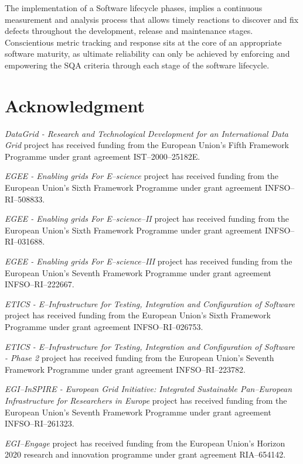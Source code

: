 \documentclass[journal]{IEEEtran}
\begin{document}
The implementation of a Software lifecycle phases, implies a continuous measurement and analysis
process that allows timely reactions to discover and fix defects throughout the
development, release and maintenance stages. Conscientious metric
tracking and response sits at the core of an appropriate software maturity, as
ultimate reliability can only be achieved by enforcing and empowering the SQA
criteria through each stage of the software lifecycle.

\section*{Acknowledgment}

{\sl DataGrid - Research and Technological Development for an International Data Grid}
project has received funding from the European Union's Fifth Framework Programme under
grant agreement IST--2000--25182E.

{\sl EGEE - Enabling grids For E--science} project has received funding from the European
Union's Sixth Framework Programme under grant agreement INFSO--RI--508833.

{\sl EGEE - Enabling grids For E--science--II} project has received funding from the
European Union's Sixth Framework Programme under grant agreement INFSO--RI--031688.

{\sl EGEE - Enabling grids For E--science--III} project has received funding from the
European Union's Seventh Framework Programme under grant agreement INFSO--RI--222667.

{\sl ETICS - E--Infrastructure for Testing, Integration and Configuration of Software}
project has received funding from the European Union's Sixth Framework Programme under
grant agreement INFSO--RI--026753.

{\sl ETICS - E--Infrastructure for Testing, Integration and Configuration of Software - Phase 2}
project has received funding from the European Union's Seventh Framework Programme under grant
agreement INFSO--RI--223782.

{\sl EGI--InSPIRE - European Grid Initiative: Integrated Sustainable Pan--European
Infrastructure for Researchers in Europe} project has received funding from the European
Union's Seventh Framework Programme under grant agreement INFSO--RI--261323.

{\sl EGI--Engage} project has received funding from the European Union's Horizon 2020
research and innovation programme under grant agreement RIA--654142.
\end{document}
